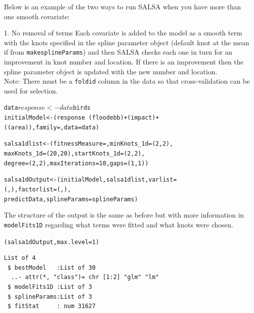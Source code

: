 \noindent Below is an example of the two ways to run SALSA when you have more than one smooth covariate:

\begin{block}{1. No removal of terms}
\noindent Each covariate is added to the model as a smooth term with the knots specified in the spline parameter object (default knot at the mean if from {\tt makesplineParams}) and then SALSA checks each one in turn for an improvement in knot number and location.  If there is an improvement then the spline parameter object is updated with the new number and location.\\

\noindent Note: There must be a {\tt foldid} column in the data so that cross-validation can be used for selection.

\begin{knitrout}\footnotesize
{}\color{fgcolor}\begin{kframe}
\begin{alltt}
data$response<- data$birds
initialModel <- (response ~ (floodebb) + (impact) + 
    ((area)), family = , data = data)

salsa1dlist<-(fitnessMeasure = , minKnots_1d=(2,2), 
                  maxKnots_1d = (20, 20), startKnots_1d = (2,2), 
                  degree=(2,2), maxIterations = 10, gaps=(1,1))

salsa1dOutput <- (initialModel, salsa1dlist, varlist=
    (, ), factorlist=(, ), 
    predictData,  splineParams=splineParams)
\end{alltt}
\end{kframe}
\end{knitrout}

\noindent The structure of the output is the same as before but with more information in {\tt modelFits1D} regarding what terms were fitted and what knots were chosen.

\begin{knitrout}\footnotesize
{}\color{fgcolor}\begin{kframe}
\begin{alltt}
(salsa1dOutput, max.level = 1)
\begin{verbatim}
List of 4
 $ bestModel   :List of 30
  ..- attr(*, "class")= chr [1:2] "glm" "lm"
 $ modelFits1D :List of 3
 $ splineParams:List of 3
 $ fitStat     : num 31627
\end{verbatim}
\end{alltt}
\end{kframe}
\end{knitrout}


\end{block}
